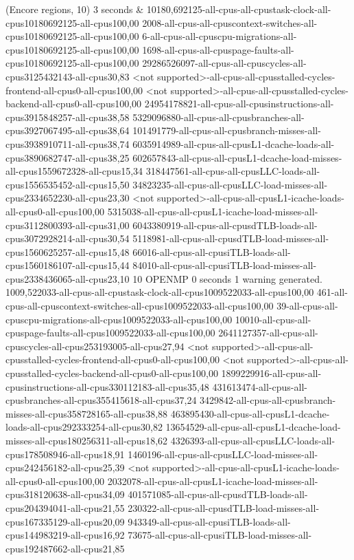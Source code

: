 (Encore regions, 10) 3 seconds
&
10180,692125-all-cpus-all-cpustask-clock-all-cpus10180692125-all-cpus100,00
2008-all-cpus-all-cpuscontext-switches-all-cpus10180692125-all-cpus100,00
6-all-cpus-all-cpuscpu-migrations-all-cpus10180692125-all-cpus100,00
1698-all-cpus-all-cpuspage-faults-all-cpus10180692125-all-cpus100,00
29286526097-all-cpus-all-cpuscycles-all-cpus3125432143-all-cpus30,83
<not supported>-all-cpus-all-cpusstalled-cycles-frontend-all-cpus0-all-cpus100,00
<not supported>-all-cpus-all-cpusstalled-cycles-backend-all-cpus0-all-cpus100,00
24954178821-all-cpus-all-cpusinstructions-all-cpus3915848257-all-cpus38,58
5329096880-all-cpus-all-cpusbranches-all-cpus3927067495-all-cpus38,64
101491779-all-cpus-all-cpusbranch-misses-all-cpus3938910711-all-cpus38,74
6035914989-all-cpus-all-cpusL1-dcache-loads-all-cpus3890682747-all-cpus38,25
602657843-all-cpus-all-cpusL1-dcache-load-misses-all-cpus1559672328-all-cpus15,34
318447561-all-cpus-all-cpusLLC-loads-all-cpus1556535452-all-cpus15,50
34823235-all-cpus-all-cpusLLC-load-misses-all-cpus2334652230-all-cpus23,30
<not supported>-all-cpus-all-cpusL1-icache-loads-all-cpus0-all-cpus100,00
5315038-all-cpus-all-cpusL1-icache-load-misses-all-cpus3112800393-all-cpus31,00
6043380919-all-cpus-all-cpusdTLB-loads-all-cpus3072928214-all-cpus30,54
5118981-all-cpus-all-cpusdTLB-load-misses-all-cpus1560625257-all-cpus15,48
66016-all-cpus-all-cpusiTLB-loads-all-cpus1560186107-all-cpus15,44
84010-all-cpus-all-cpusiTLB-load-misses-all-cpus2338436065-all-cpus23,10
10 OPENMP 0 seconds
1 warning generated.
1009,522033-all-cpus-all-cpustask-clock-all-cpus1009522033-all-cpus100,00
461-all-cpus-all-cpuscontext-switches-all-cpus1009522033-all-cpus100,00
39-all-cpus-all-cpuscpu-migrations-all-cpus1009522033-all-cpus100,00
10010-all-cpus-all-cpuspage-faults-all-cpus1009522033-all-cpus100,00
2641127357-all-cpus-all-cpuscycles-all-cpus253193005-all-cpus27,94
<not supported>-all-cpus-all-cpusstalled-cycles-frontend-all-cpus0-all-cpus100,00
<not supported>-all-cpus-all-cpusstalled-cycles-backend-all-cpus0-all-cpus100,00
1899229916-all-cpus-all-cpusinstructions-all-cpus330112183-all-cpus35,48
431613474-all-cpus-all-cpusbranches-all-cpus355415618-all-cpus37,24
3429842-all-cpus-all-cpusbranch-misses-all-cpus358728165-all-cpus38,88
463895430-all-cpus-all-cpusL1-dcache-loads-all-cpus292333254-all-cpus30,82
13654529-all-cpus-all-cpusL1-dcache-load-misses-all-cpus180256311-all-cpus18,62
4326393-all-cpus-all-cpusLLC-loads-all-cpus178508946-all-cpus18,91
1460196-all-cpus-all-cpusLLC-load-misses-all-cpus242456182-all-cpus25,39
<not supported>-all-cpus-all-cpusL1-icache-loads-all-cpus0-all-cpus100,00
2032078-all-cpus-all-cpusL1-icache-load-misses-all-cpus318120638-all-cpus34,09
401571085-all-cpus-all-cpusdTLB-loads-all-cpus204394041-all-cpus21,55
230322-all-cpus-all-cpusdTLB-load-misses-all-cpus167335129-all-cpus20,09
943349-all-cpus-all-cpusiTLB-loads-all-cpus144983219-all-cpus16,92
73675-all-cpus-all-cpusiTLB-load-misses-all-cpus192487662-all-cpus21,85
